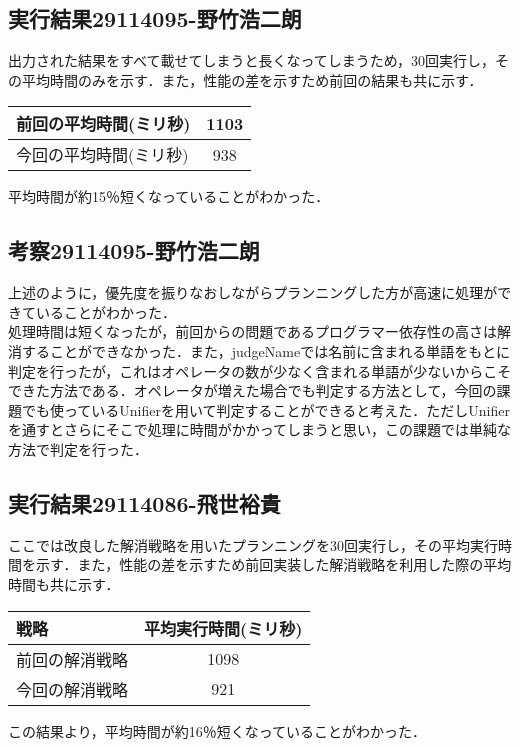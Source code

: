\documentclass{jarticle}
\begin{document}
\subsection{実行結果29114095-野竹浩二朗}
出力された結果をすべて載せてしまうと長くなってしまうため，30回実行し，その平均時間のみを示す．また，性能の差を示すため前回の結果も共に示す．
\begin{table}[H]
\begin{center}
\begin{tabular}{|l|c|}
\hline
前回の平均時間(ミリ秒) & 1103 \\ \hline
今回の平均時間(ミリ秒) & 938 \\ \hline
\end{tabular}
\end{center}
\end{table}
平均時間が約15％短くなっていることがわかった．
\subsection{考察29114095-野竹浩二朗}
上述のように，優先度を振りなおしながらプランニングした方が高速に処理ができていることがわかった．\\
処理時間は短くなったが，前回からの問題であるプログラマー依存性の高さは解消することができなかった．また，judgeNameでは名前に含まれる単語をもとに判定を行ったが，これはオペレータの数が少なく含まれる単語が少ないからこそできた方法である．オペレータが増えた場合でも判定する方法として，今回の課題でも使っているUnifierを用いて判定することができると考えた．ただしUnifierを通すとさらにそこで処理に時間がかかってしまうと思い，この課題では単純な方法で判定を行った．
\subsection{実行結果29114086-飛世裕貴}
ここでは改良した解消戦略を用いたプランニングを30回実行し，その平均実行時間を示す．また，性能の差を示すため前回実装した解消戦略を利用した際の平均時間も共に示す．
\begin{table}[H]
\begin{center}
\begin{tabular}{|l|c|}
\hline
戦略 & 平均実行時間(ミリ秒) \\ 
\hline
前回の解消戦略 & 1098 \\ \hline
今回の解消戦略 & 921 \\ \hline
\end{tabular}
\end{center}
\end{table}
この結果より，平均時間が約16％短くなっていることがわかった．
\end{document}
